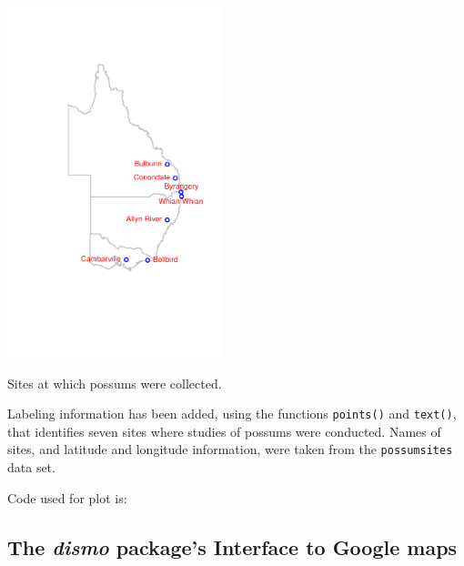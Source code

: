 \documentclass{tufte-book}\usepackage[]{graphicx}\usepackage[]{color}
\newcommand{\txtt}[1]{\texttt{#1}}
\begin{document}
\begin{marginfigure}
\begin{Schunk}


\centerline{\includegraphics[width=0.47\textwidth]{figs/13-oz-sites-1} }

\end{Schunk}
\vspace*{-21pt}

\caption{Sites at which possums were collected.\label{fig:possumsites}}
\end{marginfigure}

Labeling information has been added, using the functions
\txtt{points()} and \txtt{text()}, that identifies seven sites where
studies of possums were conducted.  Names of sites, and latitude and
longitude information, were taken from the \txtt{possumsites} data
set.

Code used for plot is:
\begin{Schunk}
\end{Schunk}

\subsection{The {\em dismo} package's Interface to Google maps}
\end{document}
